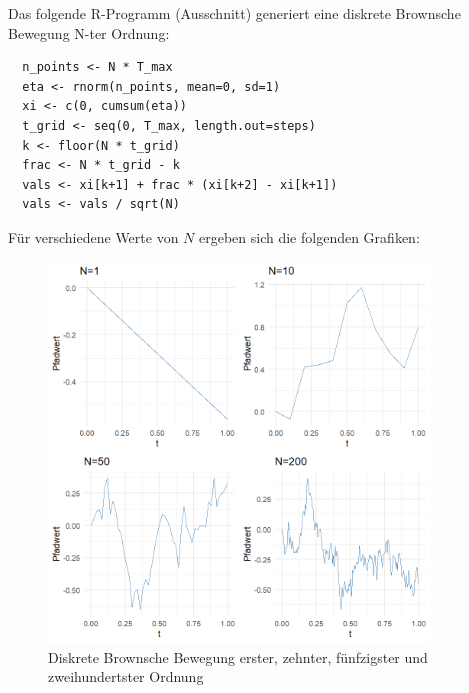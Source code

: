 \begin{bsp}
Das folgende R-Programm (Ausschnitt) generiert eine diskrete Brownsche Bewegung N-ter Ordnung:

\begin{lstlisting}
  n_points <- N * T_max
  eta <- rnorm(n_points, mean=0, sd=1)
  xi <- c(0, cumsum(eta))
  t_grid <- seq(0, T_max, length.out=steps)
  k <- floor(N * t_grid)
  frac <- N * t_grid - k
  vals <- xi[k+1] + frac * (xi[k+2] - xi[k+1])
  vals <- vals / sqrt(N)
\end{lstlisting}
Für verschiedene Werte von $N$ ergeben sich die folgenden Grafiken:

\begin{figure}[H]
    \centering
    \includegraphics[width=0.9\textwidth]{images/disrete_bb.png}
    \caption{Diskrete Brownsche Bewegung erster, zehnter, fünfzigster und zweihundertster Ordnung}
    \label{fig:brownian}
\end{figure}

\end{bsp}


